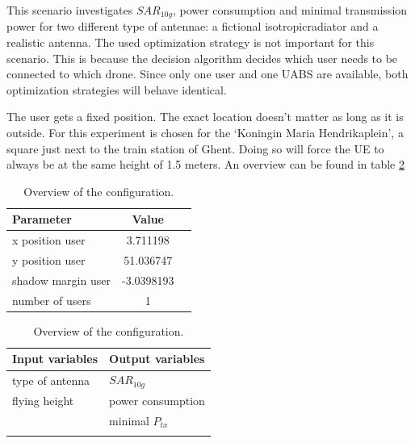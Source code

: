 This scenario investigates $SAR_{10g}$, power consumption and minimal transmission power for two different type of antennae: a 
 fictional \gls{isotropicradiator} and a realistic antenna.
 The used optimization strategy is not important
for this scenario. This is because the
 decision algorithm decides which user needs to be connected to which drone. Since only one user and one
\gls{UABS} are available, both optimization strategies will behave identical. 

The user gets a fixed position. The exact location doesn't matter as long as it is outside. For this experiment is chosen for the 
`Koningin Maria Hendrikaplein', a square just next to the train station of Ghent.  Doing so will force the \gls{UE} 
to always be at the same height of 1.5 meters. An overview can be found in table \ref{table:confOverviewScenario1}

\begin{table}[!htb]
    \begin{minipage}{.5\linewidth}
      \centering
        \begin{tabular}{|l|c|l|}
        \hline
        \textbf{Parameter}              & \textbf{Value}          \\   \hline 
        x position user               & 3.711198       \\    
        y position user               & 51.036747          \\ 
        shadow margin user             & -3.0398193 \\
        number of users                & 1 \\
        \hline
        \end{tabular}
    \end{minipage}%
    \begin{minipage}{.5\linewidth}
      \centering
            \begin{tabular}{|l|l|}
            \hline
            \textbf{Input variables  }              & \textbf{Output variables}          \\   \hline 
            type of antenna                & $SAR_{10g}$               \\ 
            flying height                  & power consumption             \\ 
                                           &  minimal $P_{tx}$ \\ 
                                           & \\
            \hline
            \end{tabular}
    \end{minipage} 
        \caption{Overview of the configuration.}
        \label{table:confOverviewScenario1}
\end{table}

